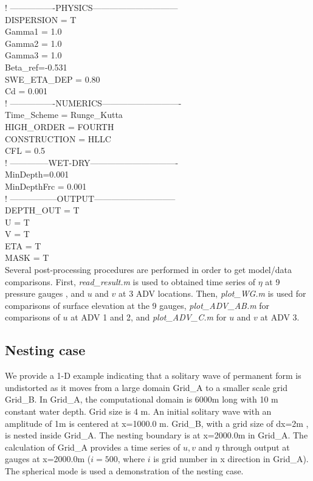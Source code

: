 \documentclass[11pt]{article}
\begin{document}
  ! ----------------PHYSICS------------------------------\\
DISPERSION = T\\
Gamma1 = 1.0\\
Gamma2 = 1.0\\
Gamma3 = 1.0\\
Beta\_ref=-0.531\\
SWE\_ETA\_DEP = 0.80\\
Cd = 0.001\\
 
  ! ----------------NUMERICS----------------------------\\
Time\_Scheme = Runge\_Kutta\\
HIGH\_ORDER = FOURTH\\
CONSTRUCTION = HLLC\\
CFL = 0.5\\

  ! --------------WET-DRY-------------------------------\\
MinDepth=0.001\\
MinDepthFrc = 0.001\\

  ! -----------------OUTPUT-----------------------------\\
DEPTH\_OUT = T\\
U = T\\
V = T\\
ETA = T\\
MASK = T\\

Several post-processing procedures are performed in order to get model/data comparisons. First, {\em read\_result.m} is used to obtained time series of $\eta$ at 9 pressure gauges , and $u$ and $v$ at 3 ADV locations. Then, {\em plot\_WG.m} is used for comparisons of  surface elevation at the 9 gauges,  {\em plot\_ADV\_AB.m} for 
comparisons of $u$ at ADV 1 and 2, and {\em plot\_ADV\_C.m} for $u$ and $v$ at ADV 3. 


\subsection{Nesting case}


We provide a 1-D example indicating that a solitary wave of permanent form is undistorted as it moves from a large domain
Grid\_A to a smaller scale grid Grid\_B.  In Grid\_A, the computational domain is 6000m long with  10 m constant water depth. Grid size is 4 m. An initial solitary wave with an amplitude of 1m is centered at  x=1000.0 m. Grid\_B,  with a grid size of dx=2m , is nested inside Grid\_A. The nesting boundary is at x=2000.0m in Grid\_A. The calculation of Grid\_A provides a time series of $u,v$ and $\eta$ through output at gauges at x=2000.0m 
($i=500$, where $i$ is grid number in x direction in Grid\_A).  The spherical mode is used a demonstration of the nesting case.
\end{document}
